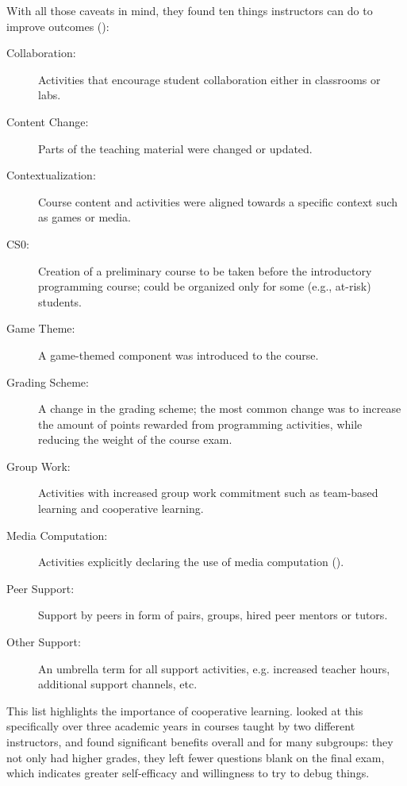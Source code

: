 With all those caveats in mind, they found ten things instructors can do to improve outcomes ():

\begin{description}

\item[Collaboration:]
  Activities that encourage student collaboration either in classrooms or labs.

\item[Content Change:]
  Parts of the teaching material were changed or updated.

\item[Contextualization:]
  Course content and activities were aligned towards a specific context such as games or media.

\item[CS0:]
  Creation of a preliminary course to be taken before the introductory programming course; could be organized only for some (e.g., at-risk) students.

\item[Game Theme:]
  A game-themed component was introduced to the course.

\item[Grading Scheme:]
  A change in the grading scheme; the most common change was to increase the amount of points rewarded from programming activities, while reducing the weight of the course exam.

\item[Group Work:]
  Activities with increased group work commitment such as team-based learning and cooperative learning.

\item[Media Computation:]
  Activities explicitly declaring the use of media computation ().

\item[Peer Support:]
  Support by peers in form of pairs, groups, hired peer mentors or tutors.

\item[Other Support:]
  An umbrella term for all support activities, e.g. increased teacher hours, additional support channels, etc.

\end{description}


This list highlights the importance of cooperative learning. \cite{Beck2013} looked at this specifically over three academic years in courses taught by two different instructors, and found significant benefits overall and for many subgroups: they not only had higher grades, they left fewer questions blank on the final exam, which indicates greater self-efficacy and willingness to try to debug things.

